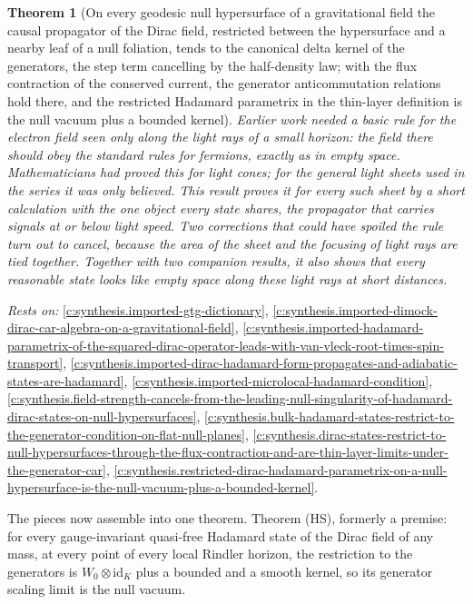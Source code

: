 \documentclass[11pt]{article}
\newtheorem{theorem}{Theorem}[section]
\theoremstyle{definition}
\theoremstyle{plain}
\begin{document}
\begin{theorem}[On every geodesic null hypersurface of a gravitational field the causal propagator of the Dirac field, restricted between the hypersurface and a nearby leaf of a null foliation, tends to the canonical delta kernel of the generators, the step term cancelling by the half-density law; with the flux contraction of the conserved current, the generator anticommutation relations hold there, and the restricted Hadamard parametrix in the thin-layer definition is the null vacuum plus a bounded kernel]\label{c:synthesis.dirac-causal-propagator-between-nearby-null-leaves-tends-to-the-generator-car-on-every-geodesic-null-hypersurface}
Earlier work needed a basic rule for the electron field seen only along the light rays of a small horizon: the field there should obey the standard rules for fermions, exactly as in empty space. Mathematicians had proved this for light cones; for the general light sheets used in the series it was only believed. This result proves it for every such sheet by a short calculation with the one object every state shares, the propagator that carries signals at or below light speed. Two corrections that could have spoiled the rule turn out to cancel, because the area of the sheet and the focusing of light rays are tied together. Together with two companion results, it also shows that every reasonable state looks like empty space along these light rays at short distances.
\end{theorem}
\noindent\emph{Rests on:} \ref{c:synthesis.imported-gtg-dictionary}, \ref{c:synthesis.imported-dimock-dirac-car-algebra-on-a-gravitational-field}, \ref{c:synthesis.imported-hadamard-parametrix-of-the-squared-dirac-operator-leads-with-van-vleck-root-times-spin-transport}, \ref{c:synthesis.imported-dirac-hadamard-form-propagates-and-adiabatic-states-are-hadamard}, \ref{c:synthesis.imported-microlocal-hadamard-condition}, \ref{c:synthesis.field-strength-cancels-from-the-leading-null-singularity-of-hadamard-dirac-states-on-null-hypersurfaces}, \ref{c:synthesis.bulk-hadamard-states-restrict-to-the-generator-condition-on-flat-null-planes}, \ref{c:synthesis.dirac-states-restrict-to-null-hypersurfaces-through-the-flux-contraction-and-are-thin-layer-limits-under-the-generator-car}, \ref{c:synthesis.restricted-dirac-hadamard-parametrix-on-a-null-hypersurface-is-the-null-vacuum-plus-a-bounded-kernel}.

The pieces now assemble into one theorem. Theorem (HS), formerly a premise: for every gauge-invariant quasi-free Hadamard state of the Dirac field of any mass, at every point of every local Rindler horizon, the restriction to the generators is $W_{0}\otimes\mathrm{id}_{K}$ plus a bounded and a smooth kernel, so its generator scaling limit is the null vacuum.
\end{document}

